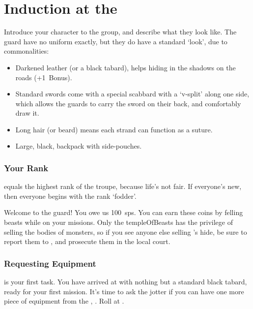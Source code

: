 \section[Induction at the \Glsfmttext{templeOfBeasts}]{Induction at the }
\label{ngIntroductions}

\begin{multicols}{2}

\noindent
Introduce your character to the group, and describe what they look like.
The \gls{guard} have no uniform exactly, but they do have a standard `look', due to commonalities:

\begin{itemize}
  \item
  Darkened leather (or a black tabard), helps hiding in the shadows on the roads (+1~Bonus).
  \item
  Standard swords come with a special scabbard with a `v-split' along one side, which allows the \glspl{guard} to carry the sword on their back, and comfortably draw it.
  \item
  Long hair (or beard) means each strand can function as a suture.
  \item
  Large, black, backpack with side-pouches.
\end{itemize}

\subsubsection{Your Rank}
\label{ngRank}
equals the highest rank of the troupe, because life's not fair.
If everyone's new, then everyone begins with the rank `\gls{fodder}'.

Welcome to the \gls{guard}!
You owe us 100~\glspl{sp}.
You can earn these coins by felling beasts while on your missions.
Only the \gls{templeOfBeasts} has the privilege of selling the bodies of \glspl{monster}, so if you see anyone else selling 's hide, be sure to report them to , and prosecute them in the local \gls{court}.

\subsubsection{Requesting Equipment}
is your first task.
You have arrived at  with nothing but a standard black tabard, ready for your first mission.
It's time to ask the \gls{jotter} if you can have one more piece of equipment from the , .
Roll  at \tn[7].


\end{multicols}
